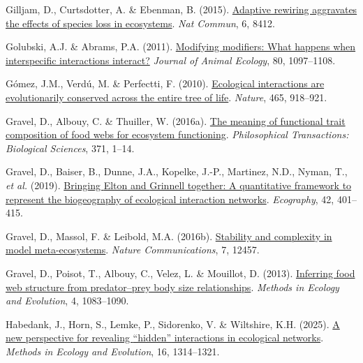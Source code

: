 \documentclass[
]{article}
\newlength{\cslhangindent}
\newenvironment{CSLReferences}[2] %
 {\begin{list}{}{%
  \setlength{\itemindent}{0pt}
  \setlength{\leftmargin}{0pt}
  \setlength{\parsep}{0pt}
  \ifodd #1
   \setlength{\leftmargin}{\cslhangindent}
   \setlength{\itemindent}{-1\cslhangindent}
  \fi
  \setlength{\itemsep}{#2\baselineskip}}}
 {\end{list}}
\begin{document}
\begin{CSLReferences}{1}{0}
Gilljam, D., Curtsdotter, A. \& Ebenman, B. (2015).
\href{https://doi.org/10.1038/ncomms9412}{Adaptive rewiring aggravates
the effects of species loss in ecosystems}. \emph{Nat Commun}, 6, 8412.

Golubski, A.J. \& Abrams, P.A. (2011).
\href{https://doi.org/10.1111/j.1365-2656.2011.01852.x}{Modifying
modifiers: What happens when interspecific interactions interact?}
\emph{Journal of Animal Ecology}, 80, 1097--1108.

Gómez, J.M., Verdú, M. \& Perfectti, F. (2010).
\href{https://doi.org/10.1038/nature09113}{Ecological interactions are
evolutionarily conserved across the entire tree of life}. \emph{Nature},
465, 918--921.

Gravel, D., Albouy, C. \& Thuiller, W. (2016a).
\href{http://www.jstor.org/stable/24768743}{The meaning of functional
trait composition of food webs for ecosystem functioning}.
\emph{Philosophical Transactions: Biological Sciences}, 371, 1--14.

Gravel, D., Baiser, B., Dunne, J.A., Kopelke, J.-P., Martinez, N.D.,
Nyman, T., \emph{et al.} (2019).
\href{https://doi.org/10.1111/ecog.04006}{Bringing {Elton} and
{Grinnell} together: A quantitative framework to represent the
biogeography of ecological interaction networks}. \emph{Ecography}, 42,
401--415.

Gravel, D., Massol, F. \& Leibold, M.A. (2016b).
\href{https://doi.org/10.1038/ncomms12457}{Stability and complexity in
model meta-ecosystems}. \emph{Nature Communications}, 7, 12457.

Gravel, D., Poisot, T., Albouy, C., Velez, L. \& Mouillot, D. (2013).
\href{https://doi.org/10.1111/2041-210X.12103}{Inferring food web
structure from predator--prey body size relationships}. \emph{Methods in
Ecology and Evolution}, 4, 1083--1090.

Habedank, J., Horn, S., Lemke, P., Sidorenko, V. \& Wiltshire, K.H.
(2025). \href{https://doi.org/10.1111/2041-210X.70077}{A new perspective
for revealing {``hidden''} interactions in ecological networks}.
\emph{Methods in Ecology and Evolution}, 16, 1314--1321.


\end{CSLReferences}
\end{document}
